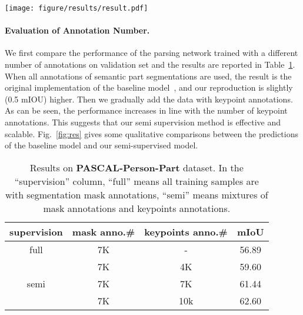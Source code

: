 \documentclass[10pt,twocolumn,letterpaper]{article}
\begin{document}
\begin{figure*}[t!]
\begin{center}
\texttt{[image: figure/results/result.pdf]}
\end{center}
\vspace{-3mm}
   \caption{Qualitative comparison on the PASCAL-Person-Part dataset between the baseline model and our semi-supervised model.}
\label{fig:res}
\vspace{-3mm}
\end{figure*}
\paragraph{Evaluation of Annotation Number.}
We first compare the performance of the parsing network trained with a different number of annotations on validation set and the results are reported in Table~\ref{tab:annotation}. When all annotations of semantic part segmentations are used, the result is the original implementation of the baseline model~\cite{chen2016attention}, and our reproduction is slightly (0.5 mIOU) higher. Then we gradually add the data with keypoint annotations. As can be seen, the performance increases in line with the number of keypoint annotations. This suggests that our semi supervision method is effective and scalable. Fig.~\ref{fig:res} gives some qualitative comparisons between the predictions of the baseline model and our semi-supervised model.
\begin{table}[t]
	\begin{center}
\begin{small}
		\begin{tabular}{c|c|c|c}
			\hline
			supervision & mask anno.\# & keypoints anno.\# & mIoU\\
			\hline
			\hline
			full & 7K & - & 56.89\\
            \hline
			\multirow{3}{*}{semi} & 7K & 4K & 59.60\\
			     & 7K & 7K & 61.44\\
			     & 7K & 10k  & 62.60\\
            \hline
		\end{tabular}
\end{small}
	\end{center}
\vspace{-3mm}
	\caption{Results on \textbf{PASCAL-Person-Part} dataset. In the ``supervision'' column, ``full'' means all training samples are with segmentation mask annotations, ``semi'' means mixtures of mask annotations and keypoints annotations. }
	\label{tab:annotation}
\vspace{-3mm}
\end{table}
\end{document}
